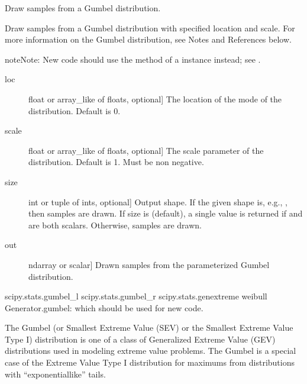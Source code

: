 \documentclass[letterpaper,10pt,english]{sphinxmanual}
\begin{document}
\begin{fulllineitems}
\label{\detokenize{infrapy.utils:infrapy.utils.ref2sac.gumbel}}
Draw samples from a Gumbel distribution.

Draw samples from a Gumbel distribution with specified location and
scale.  For more information on the Gumbel distribution, see
Notes and References below.

\begin{sphinxadmonition}{note}{Note:}
New code should use the  method of a 
instance instead; see .
\end{sphinxadmonition}
\begin{description}
\item[{loc}] \leavevmode{[}float or array\_like of floats, optional{]}
The location of the mode of the distribution. Default is 0.

\item[{scale}] \leavevmode{[}float or array\_like of floats, optional{]}
The scale parameter of the distribution. Default is 1. Must be non\sphinxhyphen{}
negative.

\item[{size}] \leavevmode{[}int or tuple of ints, optional{]}
Output shape.  If the given shape is, e.g., , then
 samples are drawn.  If size is  (default),
a single value is returned if  and  are both scalars.
Otherwise,  samples are drawn.

\end{description}
\begin{description}
\item[{out}] \leavevmode{[}ndarray or scalar{]}
Drawn samples from the parameterized Gumbel distribution.

\end{description}

scipy.stats.gumbel\_l
scipy.stats.gumbel\_r
scipy.stats.genextreme
weibull
Generator.gumbel: which should be used for new code.

The Gumbel (or Smallest Extreme Value (SEV) or the Smallest Extreme
Value Type I) distribution is one of a class of Generalized Extreme
Value (GEV) distributions used in modeling extreme value problems.
The Gumbel is a special case of the Extreme Value Type I distribution
for maximums from distributions with “exponential\sphinxhyphen{}like” tails.


\end{fulllineitems}
\end{document}
